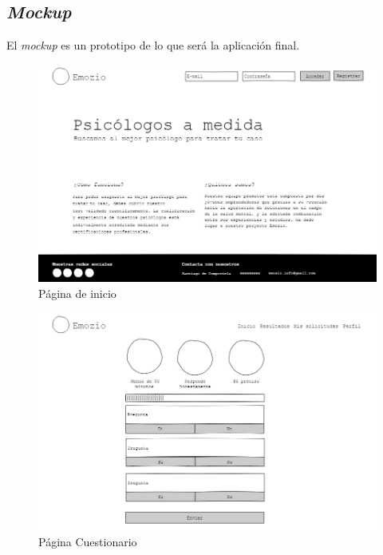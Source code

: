 \subsection{\textit{Mockup}}
El \textit{mockup} es un prototipo de lo que será la aplicación final.

\begin{figure}[htbp] 
    \centering
    \includegraphics[width=1\textwidth]{figuras/mockup_pacientes/inicio.png}
    \caption{Página de inicio}
\end{figure}	


\begin{figure}[htbp] 
    \centering
    \includegraphics[width=1\textwidth]{figuras/mockup_pacientes/cuestionario.png}
    \caption{Página Cuestionario}
\end{figure}	

